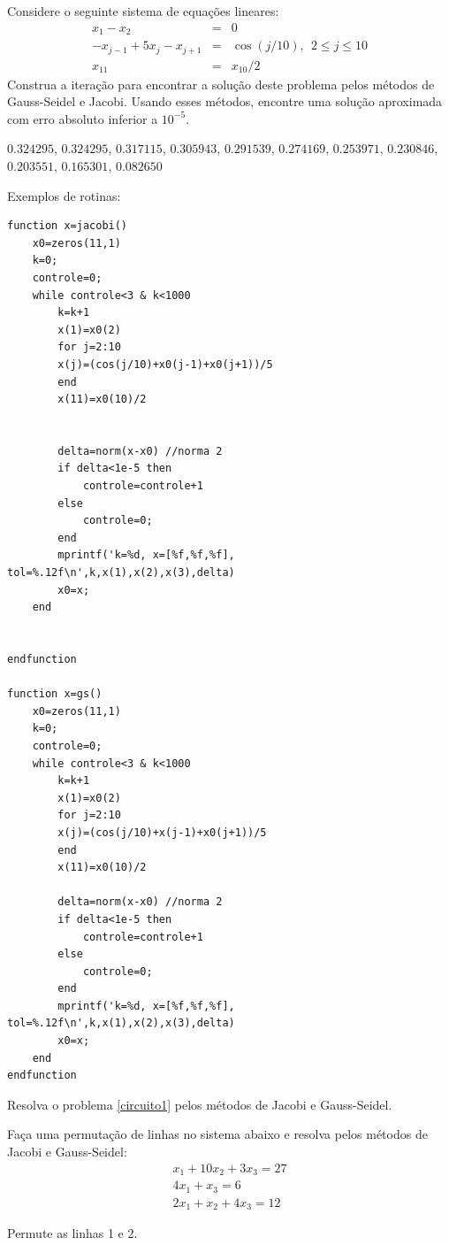 \begin{Exercise} Considere o seguinte sistema de equações lineares:
\begin{eqnarray}
x_1-x_2&=&0\nonumber\\
-x_{j-1}+5x_j-x_{j+1}&=&\cos(j/10),~~ 2\leq j \leq 10\nonumber\\
x_{11}&=&x_{10}/2
\end{eqnarray}
Construa a iteração para encontrar a solução deste problema pelos métodos de Gauss-Seidel e Jacobi. Usando esses métodos, encontre uma solução aproximada com erro absoluto inferior a $10^{-5}$.
\end{Exercise}
\begin{Answer}
  \begin{tiny}
$0.324295$, $0.324295$, $0.317115$, $0.305943$, $0.291539$, $0.274169$, $0.253971$, $0.230846$, $0.203551$, $0.165301$, $0.082650$

\ifisscilab
Exemplos de rotinas:
\begin{verbatim}
function x=jacobi()
    x0=zeros(11,1)
    k=0;
    controle=0;
    while controle<3 & k<1000
        k=k+1
        x(1)=x0(2)
        for j=2:10
        x(j)=(cos(j/10)+x0(j-1)+x0(j+1))/5
        end
        x(11)=x0(10)/2


        delta=norm(x-x0) //norma 2
        if delta<1e-5 then
            controle=controle+1
        else
            controle=0;
        end
        mprintf('k=%d, x=[%f,%f,%f], tol=%.12f\n',k,x(1),x(2),x(3),delta)
        x0=x;
    end


endfunction

function x=gs()
    x0=zeros(11,1)
    k=0;
    controle=0;
    while controle<3 & k<1000
        k=k+1
        x(1)=x0(2)
        for j=2:10
        x(j)=(cos(j/10)+x(j-1)+x0(j+1))/5
        end
        x(11)=x0(10)/2

        delta=norm(x-x0) //norma 2
        if delta<1e-5 then
            controle=controle+1
        else
            controle=0;
        end
        mprintf('k=%d, x=[%f,%f,%f], tol=%.12f\n',k,x(1),x(2),x(3),delta)
        x0=x;
    end
endfunction
\end{verbatim}    
  \end{tiny}
\end{Answer}
\fi

\begin{Exercise} Resolva o problema \ref{circuito1} pelos métodos de Jacobi e Gauss-Seidel.
\end{Exercise}

\begin{Exercise} Faça uma permutação de linhas no sistema abaixo e resolva pelos métodos de Jacobi e Gauss-Seidel:
\begin{eqnarray*}
x_1+10x_2+3x_3=27\\
4x_1+x_3=6\\
2x_1+x_2+4x_3=12
\end{eqnarray*}
\end{Exercise}
\begin{Answer}
  \begin{tiny}
Permute as linhas 1 e 2.    
  \end{tiny}
\end{Answer}


